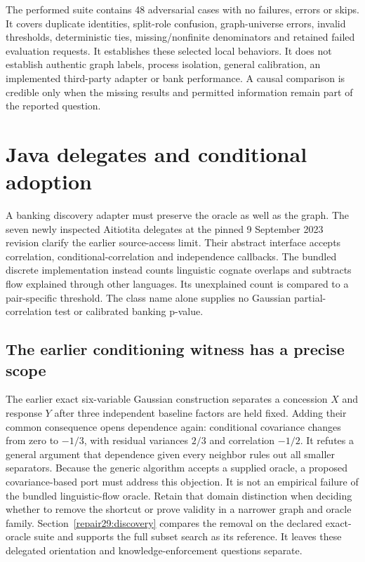The performed suite contains 48 adversarial cases with no failures, errors or
skips. It covers duplicate identities, split-role confusion, graph-universe
errors, invalid thresholds, deterministic ties, missing/nonfinite denominators
and retained failed evaluation requests. It establishes these selected local
behaviors. It does not establish authentic graph labels, process isolation,
general calibration, an implemented third-party adapter or bank performance.
A causal comparison is credible only when the missing results and permitted
information remain part of the reported question.~\citep{exec28_fj_contract}

\section[Java delegates and conditional adoption]{Java delegates and conditional adoption}
\label{sec:exec28-fj-java}
A banking discovery adapter must preserve the oracle as well as the graph.
The seven newly inspected Aitiotita delegates at the pinned 9 September 2023
revision clarify the earlier source-access limit. Their abstract interface
accepts correlation, conditional-correlation and independence callbacks. The
bundled discrete implementation instead counts linguistic cognate overlaps
and subtracts flow explained through other languages. Its unexplained count
is compared to a pair-specific threshold. The class name alone supplies no
Gaussian partial-correlation test or calibrated banking p-value.
\citep{exec28_fj_java}

\subsection{The earlier conditioning witness has a precise scope}
The earlier exact six-variable Gaussian construction separates a concession
$X$ and response $Y$ after three independent baseline factors are held fixed.
Adding their common consequence opens dependence again: conditional covariance
changes from zero to $-1/3$, with residual variances $2/3$ and correlation
$-1/2$. It refutes a general argument that dependence given every neighbor
rules out all smaller separators. Because the generic algorithm accepts a
supplied oracle, a proposed covariance-based port must address this objection.
It is not an empirical failure of the bundled linguistic-flow oracle. Retain
that domain distinction when deciding whether to remove the shortcut or prove
validity in a narrower graph and oracle family. Section~\ref{repair29:discovery}
compares the removal on the declared exact-oracle suite and supports the full
subset search as its reference. It leaves these delegated orientation and
knowledge-enforcement questions separate.
\citep{exec13_java_examples,exec13_java_aitiotita,exec28_fj_java}

